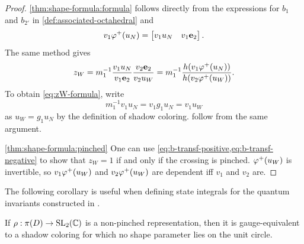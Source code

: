 \documentclass[leqno]{sl2art}
\begin{document}
\begin{proof}
  \ref{thm:shape-formula:formula}
   follows directly from the expressions for \(b_1\) and \(b_{2'}\) in \cref{def:associated-octahedral} and
  \[
    v_1 \varphi^+\mathopen{}\left(u_N\right) = \begin{bmatrix}
      v_1 u_N & v_1 \mathrm{\mathbf{e}}_{2}
    \end{bmatrix}
    .
  \]
  The same method gives
  \[
    z_W = 
    m_1^{-1}
    \frac{
      v_{1} u_N
      }{
      v_{1} \mathrm{\mathbf{e}}_{2}
    }
    \frac{
      v_{2} \mathrm{\mathbf{e}}_{2}
      }{
      v_{2} u_W
    }
    =
    m_1^{-1}
    \frac{
      h(v_{1} \varphi^+\mathopen{}\left(u_N\right))
      }{
      h(v_{2} \varphi^+\mathopen{}\left(u_W\right))
    }
    .
  \]
  To obtain \cref{eq:zW-formula}, write
  \[
    m_1^{-1} v_1 u_N
    =
    v_1 g_1 u_N
    =
    v_1 u_W
  \]
  as \(u_W = g_1 u_N\) by the definition of shadow coloring.
   follow from the same argument.

  \ref{thm:shape-formula:pinched}
  One can use \cref{eq:b-transf-positive,eq:b-transf-negative} to show that \(z_W = 1\) if and only if the crossing is pinched.
  \(\varphi^+\mathopen{}\left(u_W\right)\) is invertible, so \(v_1 \varphi^+\mathopen{}\left(u_W\right)\) and \(v_2 \varphi^+\mathopen{}\left(u_W\right)\) are dependent iff \(v_1\) and \(v_2\) are.
\end{proof}

The following corollary is useful when defining state integrals for the quantum invariants constructed in \cite{McPhailSnyderVolume}.

\begin{corollary}
  If \(\rho : \pi(D) \to \operatorname{SL}_2(\mathbb{C})\) is a non-pinched representation, then it is gauge-equivalent to a shadow coloring for which no shape parameter lies on the unit circle.
\end{corollary}
\end{document}
